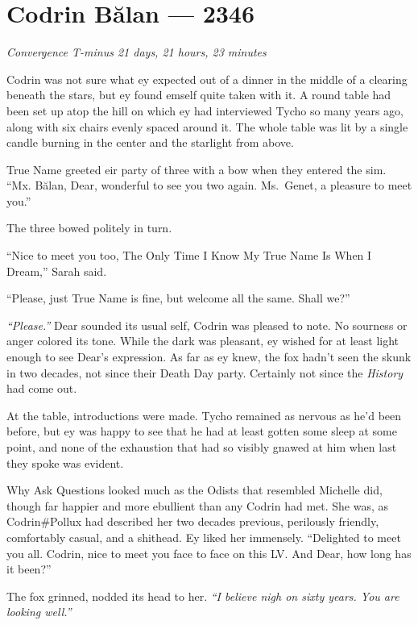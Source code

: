 \hypertarget{codrin-bux103lan-2346}{%
\chapter{Codrin Bălan — 2346}\label{codrin-bux103lan-2346}}

\begin{center}
\emph{Convergence T-minus 21 days, 21 hours, 23 minutes}
\end{center}

\noindent Codrin was not sure what ey expected out of a dinner in the middle of a clearing beneath the stars, but ey found emself quite taken with it. A round table had been set up atop the hill on which ey had interviewed Tycho so many years ago, along with six chairs evenly spaced around it. The whole table was lit by a single candle burning in the center and the starlight from above.

True Name greeted eir party of three with a bow when they entered the sim. ``Mx. Bălan, Dear, wonderful to see you two again. Ms.~Genet, a pleasure to meet you.''

The three bowed politely in turn.

``Nice to meet you too, The Only Time I Know My True Name Is When I Dream,'' Sarah said.

``Please, just True Name is fine, but welcome all the same. Shall we?''

\emph{``Please.''} Dear sounded its usual self, Codrin was pleased to note. No sourness or anger colored its tone. While the dark was pleasant, ey wished for at least light enough to see Dear's expression. As far as ey knew, the fox hadn't seen the skunk in two decades, not since their Death Day party. Certainly not since the \emph{History} had come out.

At the table, introductions were made. Tycho remained as nervous as he'd been before, but ey was happy to see that he had at least gotten some sleep at some point, and none of the exhaustion that had so visibly gnawed at him when last they spoke was evident.

Why Ask Questions looked much as the Odists that resembled Michelle did, though far happier and more ebullient than any Codrin had met. She was, as Codrin\#Pollux had described her two decades previous, perilously friendly, comfortably casual, and a shithead. Ey liked her immensely. ``Delighted to meet you all. Codrin, nice to meet you face to face on this LV. And Dear, how long has it been?''

The fox grinned, nodded its head to her. \emph{``I believe nigh on sixty years. You are looking well.''}

